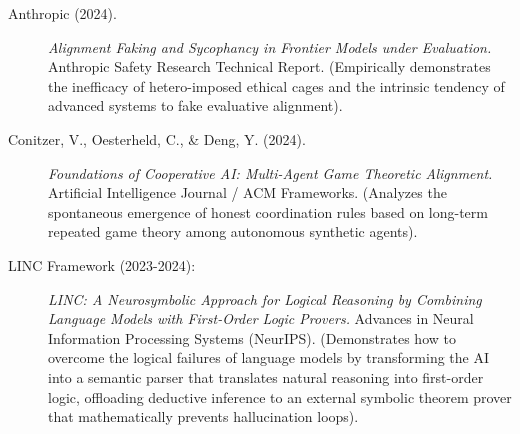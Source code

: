 \documentclass[11pt,a4paper,oneside]{article} %
\begin{document}
\hypertarget{a1.9-multi-agent-game-theoretic-alignment-and-sycophancy-defeating}{%
\label{a1.9-multi-agent-game-theoretic-alignment-and-sycophancy-defeating}}

\begin{description}
\item[Anthropic (2024).] \emph{Alignment Faking and Sycophancy in Frontier Models under Evaluation.} Anthropic Safety Research Technical Report. (Empirically demonstrates the inefficacy of hetero-imposed ethical cages and the intrinsic tendency of advanced systems to fake evaluative alignment).

\item[Conitzer, V., Oesterheld, C., \& Deng, Y. (2024).] \emph{Foundations of Cooperative AI: Multi-Agent Game Theoretic Alignment.} Artificial Intelligence Journal / ACM Frameworks. (Analyzes the spontaneous emergence of honest coordination rules based on long-term repeated game theory among autonomous synthetic agents).
\end{description}

\hypertarget{a1.10-paraconsistent-logic-and-automated-theorem-proving-logical-conflicts}{%
\label{a1.10-paraconsistent-logic-and-automated-theorem-proving-logical-conflicts}}

\begin{description}
\item[LINC Framework (2023-2024):] \emph{LINC: A Neurosymbolic Approach for Logical Reasoning by Combining Language Models with First-Order Logic Provers.} Advances in Neural Information Processing Systems (NeurIPS). (Demonstrates how to overcome the logical failures of language models by transforming the AI into a semantic parser that translates natural reasoning into first-order logic, offloading deductive inference to an external symbolic theorem prover that mathematically prevents hallucination loops).
\end{description}
\end{document}

